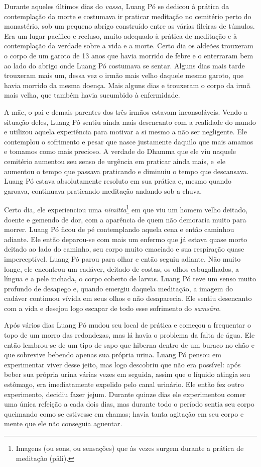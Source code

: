 Durante aqueles últimos dias do \emph{vassa,} Luang Pó se dedicou à
prática da contemplação da morte e costumava ir praticar meditação no
cemitério perto do monastério, sob um pequeno abrigo construído entre as
várias fileiras de túmulos. Era um lugar pacífico e recluso, muito
adequado à prática de meditação e à contemplação da verdade sobre a vida
e a morte. Certo dia os aldeões trouxeram o corpo de um garoto de 13
anos que havia morrido de febre e o enterraram bem ao lado do abrigo
onde Luang Pó costumava se sentar. Alguns dias mais tarde trouxeram mais
um, dessa vez o irmão mais velho daquele mesmo garoto, que havia morrido
da mesma doença. Mais alguns dias e trouxeram o corpo da irmã mais
velha, que também havia sucumbido à enfermidade.

A mãe, o pai e demais parentes dos três irmãos estavam inconsoláveis.
Vendo a situação deles, Luang Pó sentiu ainda mais desencanto com a
realidade do mundo e utilizou aquela experiência para motivar a si mesmo
a não ser negligente. Ele contemplou o sofrimento e pesar que nasce
justamente daquilo que mais amamos e tomamos como mais precioso. A
verdade do Dhamma que ele viu naquele cemitério aumentou seu senso de
urgência em praticar ainda mais, e~ele aumentou o tempo que passava
praticando e diminuiu o tempo que descansava. Luang Pó estava
absolutamente resoluto em sua prática e, mesmo quando garoava,
continuava praticando meditação andando sob a chuva.

Certo dia, ele experienciou uma \emph{nimitta}\footnote{Imagens (ou
  sons, ou sensações) que às vezes surgem durante a prática de meditação
  (pāli).} em que viu um homem velho deitado, doente e gemendo de dor,
com a aparência de quem não demoraria muito para morrer. Luang Pó ficou
de pé contemplando aquela cena e então caminhou adiante. Ele então
deparou-se com mais um enfermo que já estava quase morto deitado ao lado
do caminho, seu corpo muito emaciado e sua respiração quase
imperceptível. Luang Pó parou para olhar e então seguiu adiante. Não
muito longe, ele encontrou um cadáver, deitado de costas, os olhos
esbugalhados, a língua e a pele inchada, o corpo coberto de larvas.
Luang Pó teve um senso muito profundo de desapego e, quando emergiu
daquela meditação, a imagem do cadáver continuou vívida em seus olhos e
não desaparecia. Ele sentiu desencanto com a vida e desejou logo escapar
de todo esse sofrimento do \emph{samsāra}.

Após vários dias Luang Pó mudou seu local de prática e começou a
frequentar o topo de um morro das redondezas, mas lá havia o problema da
falta de água. Ele então lembrou-se de um tipo de sapo que hiberna
dentro de um buraco no chão e que sobrevive bebendo apenas sua própria
urina. Luang Pó pensou em experimentar viver desse jeito, mas logo
descobriu que não era possível: após beber sua própria urina várias
vezes em seguida, assim que o líquido atingia seu estômago, era
imediatamente expelido pelo canal urinário. Ele então fez outro
experimento, decidiu fazer jejum. Durante quinze dias ele experimentou
comer uma única refeição a cada dois dias, mas durante todo o período
sentia seu corpo queimando como se estivesse em chamas; havia tanta
agitação em seu corpo e mente que ele não conseguia aguentar.

